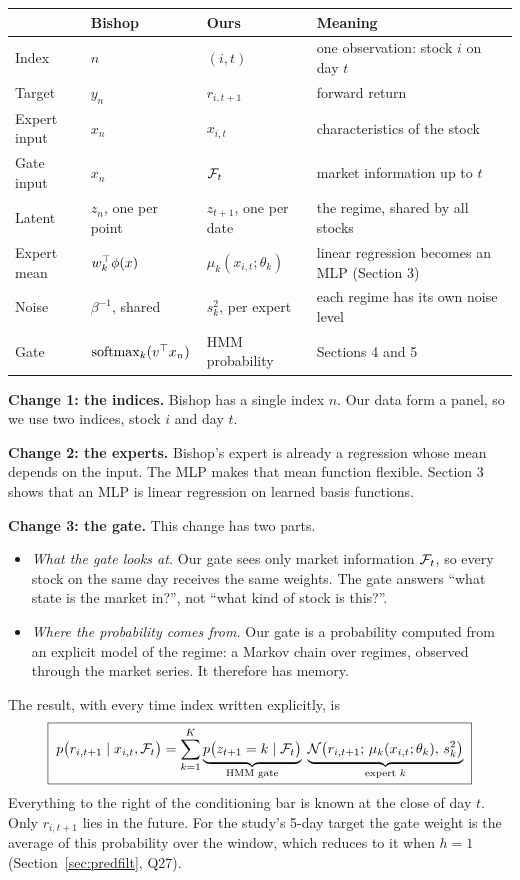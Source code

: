 \begin{center}
\renewcommand{\arraystretch}{1.2}
\begin{tabularx}{\textwidth}{@{}lllX@{}}
\toprule
 & Bishop & Ours & Meaning \\
\midrule
Index & $n$ & $(i,t)$ & one observation: stock $i$ on day $t$ \\
Target & $y_n$ & $r_{i,t+1}$ & forward return \\
Expert input & $x_n$ & $x_{i,t}$ & characteristics of the stock \\
Gate input & $x_n$ & $\mathcal{F}_t$ & market information up to $t$ \\
Latent & $z_n$, one per point & $z_{t+1}$, one per date & the regime, shared by all stocks \\
Expert mean & $w_k^{\top}\phi(x)$ & $\mu_k(x_{i,t};\theta_k)$ & linear regression becomes an MLP (Section 3) \\
Noise & $\beta^{-1}$, shared & $s_k^2$, per expert & each regime has its own noise level \\
Gate & $\operatorname{softmax}_k(v^{\top} x_n)$ & HMM probability & Sections 4 and 5 \\
\bottomrule
\end{tabularx}
\end{center}

\textbf{Change 1: the indices.} Bishop has a single index $n$. Our data form a panel, so we use two indices, stock $i$ and day $t$.

\textbf{Change 2: the experts.} Bishop's expert is already a regression whose mean depends on the input. The MLP makes that mean function flexible. Section 3 shows that an MLP is linear regression on learned basis functions.

\textbf{Change 3: the gate.} This change has two parts.
\begin{itemize}
  \item \emph{What the gate looks at.} Our gate sees only market information $\mathcal{F}_t$, so every stock on the same day receives the same weights. The gate answers ``what state is the market in?'', not ``what kind of stock is this?''.
  \item \emph{Where the probability comes from.} Our gate is a probability computed from an explicit model of the regime: a Markov chain over regimes, observed through the market series. It therefore has memory.
\end{itemize}

The result, with every time index written explicitly, is
\begin{equation}\label{eq:our-moe}
\boxed{\;p\big(r_{i,t+1}\mid x_{i,t},\mathcal{F}_t\big)=\sum_{k=1}^K \underbrace{p\big(z_{t+1}=k\mid \mathcal{F}_t\big)}_{\text{HMM gate}}\;\underbrace{\mathcal{N}\big(r_{i,t+1};\,\mu_k(x_{i,t};\theta_k),\,s_k^2\big)}_{\text{expert }k}\;}
\end{equation}
Everything to the right of the conditioning bar is known at the close of day $t$. Only $r_{i,t+1}$ lies in the future. For the study's 5-day target the gate weight is the average of this probability over the window, which reduces to it when $h=1$ (Section~\ref{sec:predfilt}, Q27).

